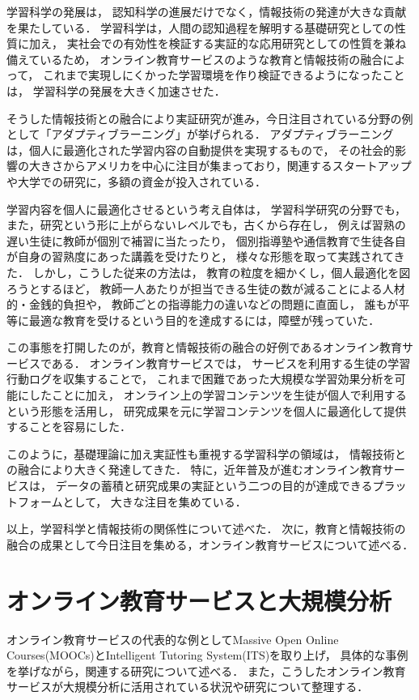 学習科学の発展は，
認知科学の進展だけでなく，情報技術の発達が大きな貢献を果たしている．
学習科学は，人間の認知過程を解明する基礎研究としての性質に加え，
実社会での有効性を検証する実証的な応用研究としての性質を兼ね備えているため，
オンライン教育サービスのような教育と情報技術の融合によって，
これまで実現しにくかった学習環境を作り検証できるようになったことは，
学習科学の発展を大きく加速させた．

そうした情報技術との融合により実証研究が進み，今日注目されている分野の例として「アダプティブラーニング」が挙げられる．
アダプティブラーニングは，個人に最適化された学習内容の自動提供を実現するもので，
その社会的影響の大きさからアメリカを中心に注目が集まっており，関連するスタートアップや大学での研究に，多額の資金が投入されている\cite{piccioli2014learning}．

学習内容を個人に最適化させるという考え自体は，
学習科学研究の分野でも，また，研究という形に上がらないレベルでも，古くから存在し，
例えば習熟の遅い生徒に教師が個別で補習に当たったり，
個別指導塾や通信教育で生徒各自が自身の習熟度にあった講義を受けたりと，
様々な形態を取って実践されてきた．
しかし，こうした従来の方法は，
教育の粒度を細かくし，個人最適化を図ろうとするほど，
教師一人あたりが担当できる生徒の数が減ることによる人材的・金銭的負担や，
教師ごとの指導能力の違いなどの問題に直面し，
誰もが平等に最適な教育を受けるという目的を達成するには，障壁が残っていた．

この事態を打開したのが，教育と情報技術の融合の好例であるオンライン教育サービスである．
オンライン教育サービスでは，
サービスを利用する生徒の学習行動ログを収集することで，
これまで困難であった大規模な学習効果分析を可能にしたことに加え，
オンライン上の学習コンテンツを生徒が個人で利用するという形態を活用し，
研究成果を元に学習コンテンツを個人に最適化して提供することを容易にした．


このように，基礎理論に加え実証性も重視する学習科学の領域は，
情報技術との融合により大きく発達してきた．
特に，近年普及が進むオンライン教育サービスは，
データの蓄積と研究成果の実証という二つの目的が達成できるプラットフォームとして，
大きな注目を集めている．



以上，学習科学と情報技術の関係性について述べた．
次に，教育と情報技術の融合の成果として今日注目を集める，オンライン教育サービスについて述べる．



\section{オンライン教育サービスと大規模分析}
オンライン教育サービスの代表的な例としてMassive Open Online Courses(MOOCs)とIntelligent Tutoring System(ITS)を取り上げ，
具体的な事例を挙げながら，関連する研究について述べる．
また，こうしたオンライン教育サービスが大規模分析に活用されている状況や研究について整理する．

